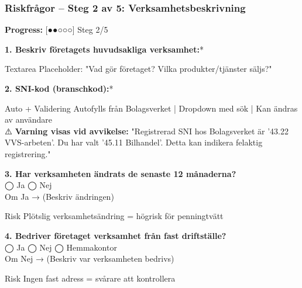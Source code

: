 \documentclass[10pt]{beamer}
\begin{document}
\begin{frame}[label=riskfragor-steg2]
  \frametitle{Riskfrågor – Steg 2 av 5: Verksamhetsbeskrivning}

  \begin{center}
    \textbf{Progress:} [●●○○○] Steg 2/5
  \end{center}

  \vspace{0.5cm}

  \footnotesize

  \textbf{1. Beskriv företagets huvudsakliga verksamhet:}*
  \begin{block}{Textarea}
    \tiny Placeholder: "Vad gör företaget? Vilka produkter/tjänster säljs?"
  \end{block}

  \vspace{0.3cm}

  \textbf{2. SNI-kod (branschkod):}* \underline{\hspace{7cm}}
  \begin{block}{Auto + Validering}
    \tiny Autofylls från Bolagsverket | Dropdown med sök | Kan ändras av användare\\
    ⚠️ \textbf{Varning visas vid avvikelse:} "Registrerad SNI hos Bolagsverket är '43.22 VVS-arbeten'. Du har valt '45.11 Bilhandel'. Detta kan indikera felaktig registrering."
  \end{block}

  \vspace{0.3cm}

  \textbf{3. Har verksamheten ändrats de senaste 12 månaderna?}\\
  ◯ Ja \hspace{0.5cm} ◯ Nej\\
  Om Ja → \underline{\hspace{6cm}} (Beskriv ändringen)
  \begin{block}{Risk}
    \tiny Plötslig verksamhetsändring = högrisk för penningtvätt
  \end{block}

  \vspace{0.3cm}

  \textbf{4. Bedriver företaget verksamhet från fast driftställe?}\\
  ◯ Ja \hspace{0.3cm} ◯ Nej \hspace{0.3cm} ◯ Hemmakontor\\
  Om Nej → \underline{\hspace{6cm}} (Beskriv var verksamheten bedrivs)
  \begin{block}{Risk}
    \tiny Ingen fast adress = svårare att kontrollera
  \end{block}

  \vspace{0.5cm}
  \begin{flushright}
    \hyperlink{riskfragor-steg1}{} \hspace{0.3cm} \hyperlink{riskfragor-steg3}{}
  \end{flushright}
\end{frame}
\end{document}
